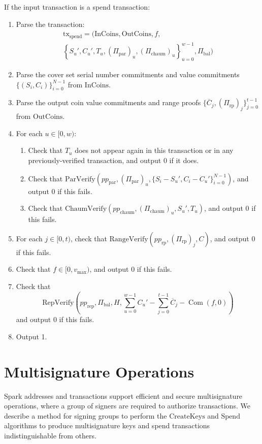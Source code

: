 \documentclass{llncs}
\newcommand{\com}{\operatorname{Com}}
\begin{document}
If the input transaction is a spend transaction:
\begin{enumerate}
    \item Parse the transaction:
    \begin{multline*}
    \text{tx}_{\text{spend}} = ( \text{InCoins}, \text{OutCoins}, f, \\
    \left\{ S_u', C_u', T_u, (\Pi_{\text{par}})_u, (\Pi_{\text{chaum}})_u \right\}_{u=0}^{w-1}, \Pi_{\text{bal}} )
    \end{multline*}
    \item Parse the cover set serial number commitments and value commitments $\{(S_i, C_i)\}_{i=0}^{N-1}$ from $\text{InCoins}$.
    \item Parse the output coin value commitments and range proofs $\{ \overline{C}_j, (\Pi_{\text{rp}})_j \}_{j=0}^{t-1}$ from $\text{OutCoins}$.
    \item For each $u \in [0,w):$
    \begin{enumerate}
        \item Check that $T_u$ does not appear again in this transaction or in any previously-verified transaction, and output 0 if it does.
        \item Check that $\text{ParVerify}(pp_{\text{par}},(\Pi_{\text{par}})_u,\{S_i - S_u',C_i - C_u'\}_{i=0}^{N-1})$, and output 0 if this fails.
        \item Check that $\text{ChaumVerify}(pp_{\text{chaum}},(\Pi_{\text{chaum}})_u,S_u',T_u)$, and output 0 if this fails.
    \end{enumerate}
    \item For each $j \in [0,t)$, check that $\text{RangeVerify}(pp_{\text{rp}},(\Pi_{\text{rp}})_j,C)$, and output 0 if this fails.
    \item Check that $f \in [0,v_{\text{max}})$, and output 0 if this fails.
    \item Check that $$\text{RepVerify}\left( pp_{\text{rep}}, \Pi_{\text{bal}}, H, \sum_{u=0}^{w-1} C_u' - \sum_{j=0}^{t-1} \overline{C}_j - \com(f,0) \right)$$ and output 0 if this fails.
    \item Output 1.
\end{enumerate}


\section{Multisignature Operations}

Spark addresses and transactions support efficient and secure multisignature operations, where a group of signers are required to authorize transactions.
We describe a method for signing groups to perform the $\text{CreateKeys}$ and $\text{Spend}$ algorithms to produce multisignature keys and spend transactions indistinguishable from others.
\end{document}
